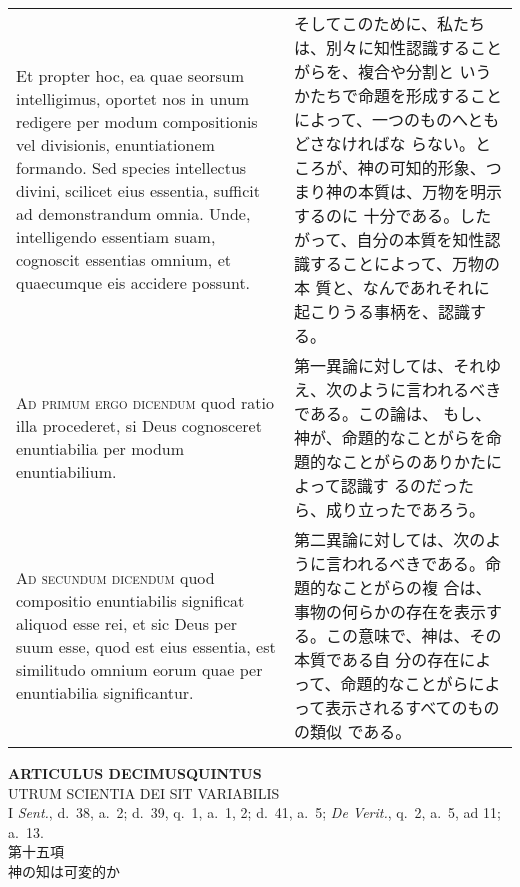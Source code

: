 \documentclass[10pt]{jsarticle} %
\begin{document}
\begin{longtable}{p{21em}p{21em}}
Et propter hoc, ea quae seorsum intelligimus, oportet nos
in unum redigere per modum compositionis vel divisionis, enuntiationem
formando. Sed species intellectus divini, scilicet eius essentia,
sufficit ad demonstrandum omnia. Unde, intelligendo essentiam suam,
cognoscit essentias omnium, et quaecumque eis accidere possunt.


&

そしてこのために、私たちは、別々に知性認識することがらを、複合や分割と
いうかたちで命題を形成することによって、一つのものへともどさなければな
らない。ところが、神の可知的形象、つまり神の本質は、万物を明示するのに
十分である。したがって、自分の本質を知性認識することによって、万物の本
質と、なんであれそれに起こりうる事柄を、認識する。

\\


{\scshape Ad primum ergo dicendum} quod ratio illa
procederet, si Deus cognosceret enuntiabilia per modum enuntiabilium.


&

第一異論に対しては、それゆえ、次のように言われるべきである。この論は、
もし、神が、命題的なことがらを命題的なことがらのありかたによって認識す
るのだったら、成り立ったであろう。

\\


{\scshape Ad secundum dicendum} quod compositio
enuntiabilis significat aliquod esse rei, et sic Deus per suum esse,
quod est eius essentia, est similitudo omnium eorum quae per
enuntiabilia significantur.

&


第二異論に対しては、次のように言われるべきである。命題的なことがらの複
合は、事物の何らかの存在を表示する。この意味で、神は、その本質である自
分の存在によって、命題的なことがらによって表示されるすべてのものの類似
である。

\end{longtable}
\newpage



\begin{center}
 {\Large {\bf ARTICULUS DECIMUSQUINTUS}}\\
 {\large UTRUM SCIENTIA DEI SIT VARIABILIS}\\
 {\footnotesize I {\itshape Sent.}, d.~38, a.~2; d.~39, q.~1, a.~1, 2;
 d.~41, a.~5; {\itshape De Verit.}, q.~2, a.~5, ad 11; a.~13.}\\
 {\Large 第十五項\\神の知は可変的か}
\end{center}
\end{document}
